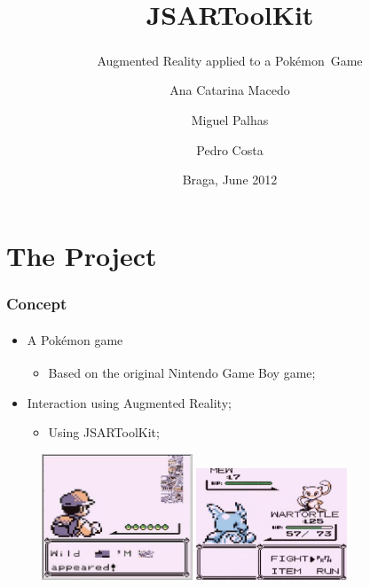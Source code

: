 \documentclass{beamer}
\title{JSARToolKit}
\subtitle{Augmented Reality applied to a Pokémon\textsuperscript{\textregistered}\ Game}
\author[A.C.Macedo \and M.Palhas \and P.Costa]{Ana Catarina Macedo
\and Miguel Palhas
\and Pedro Costa}
\institute[]{
	University of Minho\\
	Department of Informatics
}
\date{Braga, June 2012}
\begin{document}

\frame[plain]{\titlepage}





\section{The Project}
\begin{frame}
	\frametitle{Concept}
	\begin{itemize}
		\item{A Pokémon\textsuperscript{\textregistered} game
		\begin{itemize}
			\item{Based on the original Nintendo\textsuperscript{\textregistered} Game Boy\textsuperscript{\textregistered} game;}
		\end{itemize}
		}
		\item{Interaction using Augmented Reality;
		\begin{itemize}
			\item{Using JSARToolKit;}
		\end{itemize}
		}
	\end{itemize}
	
	\begin{figure}
		\begin{center}
			\includegraphics[width=0.4\textwidth]{slides/images/missingno.jpeg}
			\;
			\includegraphics[width=0.4\textwidth]{slides/images/mew.png}
		\end{center}
	\end{figure}
\end{frame}
\end{document}
